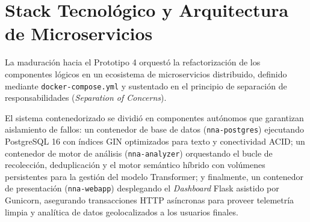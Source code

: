 \section{Stack Tecnológico y Arquitectura de Microservicios}
\label{sec:met_stack_docker}

La maduración hacia el Prototipo 4 orquestó la refactorización de los componentes lógicos en un ecosistema de microservicios distribuido, definido mediante \texttt{docker-compose.yml} y sustentado en el principio de separación de responsabilidades (\textit{Separation of Concerns}). 

El sistema contenedorizado se dividió en componentes autónomos que garantizan aislamiento de fallos: un contenedor de base de datos (\texttt{nna-postgres}) ejecutando PostgreSQL 16 con índices GIN optimizados para texto y conectividad ACID; un contenedor de motor de análisis (\texttt{nna-analyzer}) orquestando el bucle de recolección, deduplicación y el motor semántico híbrido con volúmenes persistentes para la gestión del modelo Transformer; y finalmente, un contenedor de presentación (\texttt{nna-webapp}) desplegando el \textit{Dashboard} Flask asistido por Gunicorn, asegurando transacciones HTTP asíncronas para proveer telemetría limpia y analítica de datos geolocalizados a los usuarios finales.

